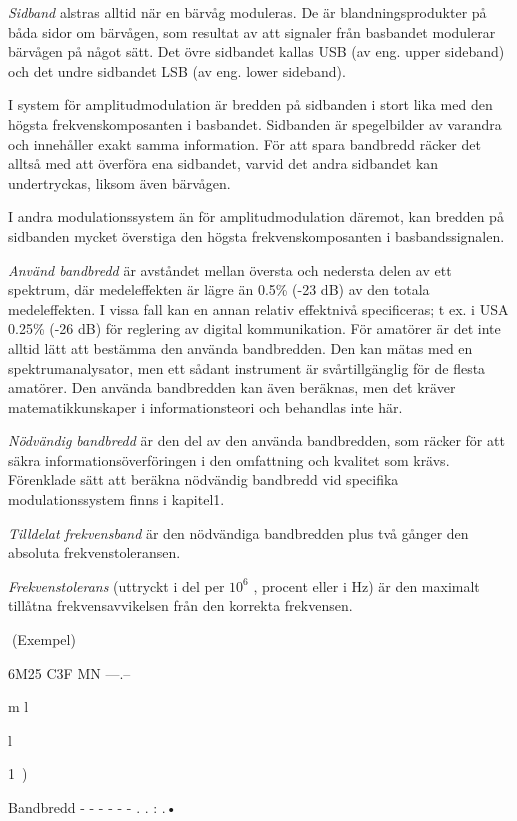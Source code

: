 \emph{Sidband} alstras alltid när en bärvåg moduleras. De är
blandningsprodukter på båda sidor om bärvågen, som resultat av att
signaler från basbandet modulerar bärvågen på något sätt. Det övre
sidbandet kallas USB (av eng. upper sideband) och det undre sidbandet
LSB (av eng. lower sideband).

I system för amplitudmodulation är bredden på sidbanden i stort lika
med den högsta frekvenskomposanten i basbandet. Sidbanden är
spegelbilder av varandra och innehåller exakt samma information. För
att spara bandbredd räcker det alltså med att överföra ena sidbandet,
varvid det andra sidbandet kan undertryckas, liksom även bärvågen.

I andra modulationssystem än för amplitudmodulation däremot, kan
bredden på sidbanden mycket överstiga den högsta frekvenskomposanten i
basbandssignalen.

\emph{Använd bandbredd} är avståndet mellan översta och nedersta delen
av ett spektrum, där medeleffekten är lägre än 0.5\% (-23 dB) av den
totala medeleffekten. I vissa fall kan en annan relativ effektnivå
specificeras; t ex.  i USA 0.25\% (-26 dB) för reglering av digital
kommunikation. För amatörer är det inte alltid lätt att bestämma den
använda bandbredden. Den kan mätas med en spektrumanalysator, men ett
sådant instrument är svårtillgänglig för de flesta amatörer. Den
använda bandbredden kan även beräknas, men det kräver
matematikkunskaper i informationsteori och behandlas inte här.

\emph{Nödvändig bandbredd} är den del av den använda bandbredden, som
räcker för att säkra informationsöverföringen i den omfattning och
kvalitet som krävs. Förenklade sätt att beräkna nödvändig bandbredd
vid specifika modulationssystem finns i kapitel1.

\emph{Tilldelat frekvensband} är den nödvändiga bandbredden plus två
gånger den absoluta frekvenstoleransen.

\emph{Frekvenstolerans} (uttryckt i del per \(10^6\) , procent eller i
Hz) är den maximalt tillåtna frekvensavvikelsen från den korrekta
frekvensen.

(Exempel)

6M25
C3F MN
---.-- ~~~

m
l

l

1\ )

Bandbredd - - - - - - . . : .•

